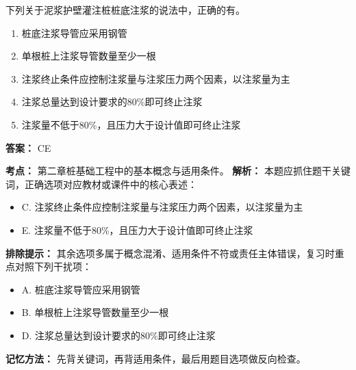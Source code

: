 \documentclass[UTF8,fontset=fandol,11pt]{ctexart}
\begin{document}
\begin{quizbox}[title={第 4 题}]
下列关于泥浆护壁灌注桩桩底注浆的说法中，正确的有。\\
\begin{enumerate}[label=\Alph*.]
\item 桩底注浆导管应采用钢管
\item 单根桩上注浆导管数量至少一根
\item 注浆终止条件应控制注浆量与注浆压力两个因素，以注浆量为主
\item 注浆总量达到设计要求的80\%即可终止注浆
\item 注浆量不低于80\%，且压力大于设计值即可终止注浆
\end{enumerate}
\textbf{答案：} CE
\vspace{0.25em}
\begin{answerbox}[title={考点解析}]
\textbf{考点：} 第二章桩基础工程中的基本概念与适用条件。
\textbf{解析：} 本题应抓住题干关键词，正确选项对应教材或课件中的核心表述：
\begin{itemize}
\item C. 注浆终止条件应控制注浆量与注浆压力两个因素，以注浆量为主
\item E. 注浆量不低于80\%，且压力大于设计值即可终止注浆
\end{itemize}
\textbf{排除提示：} 其余选项多属于概念混淆、适用条件不符或责任主体错误，复习时重点对照下列干扰项：
\begin{itemize}
\item A. 桩底注浆导管应采用钢管
\item B. 单根桩上注浆导管数量至少一根
\item D. 注浆总量达到设计要求的80\%即可终止注浆
\end{itemize}
\textbf{记忆方法：} 先背关键词，再背适用条件，最后用题目选项做反向检查。
\end{answerbox}
\end{quizbox}

\vspace{0.2em}
\end{document}
